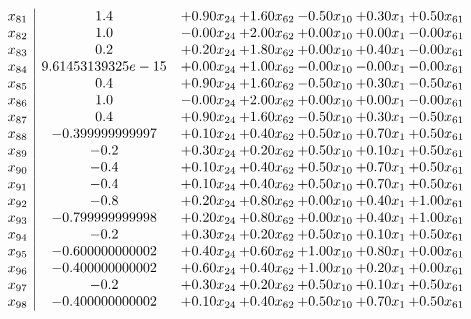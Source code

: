 \documentclass[8pt]{article}
\begin{document}
\[\begin{array}{c| c c@{\hskip 2pt} c@{\hskip 2pt} c@{\hskip 2pt} c@{\hskip 2pt} c@{\hskip 2pt} }
 x_{81}   &  1.4 & +  0.90 x_{24} & +  1.60 x_{62} & -0.50 x_{10} & +  0.30 x_{1} & +  0.50 x_{61}\\
 x_{82}   &  1.0 & -0.00 x_{24} & +  2.00 x_{62} & +  0.00 x_{10} & +  0.00 x_{1} & -0.00 x_{61}\\
 x_{83}   &  0.2 & +  0.20 x_{24} & +  1.80 x_{62} & +  0.00 x_{10} & +  0.40 x_{1} & -0.00 x_{61}\\
 x_{84}   &  9.61453139325e-15 & +  0.00 x_{24} & +  1.00 x_{62} & -0.00 x_{10} & -0.00 x_{1} & -0.00 x_{61}\\
 x_{85}   &  0.4 & +  0.90 x_{24} & +  1.60 x_{62} & -0.50 x_{10} & +  0.30 x_{1} & -0.50 x_{61}\\
 x_{86}   &  1.0 & -0.00 x_{24} & +  2.00 x_{62} & +  0.00 x_{10} & +  0.00 x_{1} & -0.00 x_{61}\\
 x_{87}   &  0.4 & +  0.90 x_{24} & +  1.60 x_{62} & -0.50 x_{10} & +  0.30 x_{1} & -0.50 x_{61}\\
 x_{88}   &  -0.399999999997 & +  0.10 x_{24} & +  0.40 x_{62} & +  0.50 x_{10} & +  0.70 x_{1} & +  0.50 x_{61}\\
 x_{89}   &  -0.2 & +  0.30 x_{24} & +  0.20 x_{62} & +  0.50 x_{10} & +  0.10 x_{1} & +  0.50 x_{61}\\
 x_{90}   &  -0.4 & +  0.10 x_{24} & +  0.40 x_{62} & +  0.50 x_{10} & +  0.70 x_{1} & +  0.50 x_{61}\\
 x_{91}   &  -0.4 & +  0.10 x_{24} & +  0.40 x_{62} & +  0.50 x_{10} & +  0.70 x_{1} & +  0.50 x_{61}\\
 x_{92}   &  -0.8 & +  0.20 x_{24} & +  0.80 x_{62} & +  0.00 x_{10} & +  0.40 x_{1} & +  1.00 x_{61}\\
 x_{93}   &  -0.799999999998 & +  0.20 x_{24} & +  0.80 x_{62} & +  0.00 x_{10} & +  0.40 x_{1} & +  1.00 x_{61}\\
 x_{94}   &  -0.2 & +  0.30 x_{24} & +  0.20 x_{62} & +  0.50 x_{10} & +  0.10 x_{1} & +  0.50 x_{61}\\
 x_{95}   &  -0.600000000002 & +  0.40 x_{24} & +  0.60 x_{62} & +  1.00 x_{10} & +  0.80 x_{1} & +  0.00 x_{61}\\
 x_{96}   &  -0.400000000002 & +  0.60 x_{24} & +  0.40 x_{62} & +  1.00 x_{10} & +  0.20 x_{1} & +  0.00 x_{61}\\
 x_{97}   &  -0.2 & +  0.30 x_{24} & +  0.20 x_{62} & +  0.50 x_{10} & +  0.10 x_{1} & +  0.50 x_{61}\\
 x_{98}   &  -0.400000000002 & +  0.10 x_{24} & +  0.40 x_{62} & +  0.50 x_{10} & +  0.70 x_{1} & +  0.50 x_{61}\\

\end{array}\]
\end{document}
